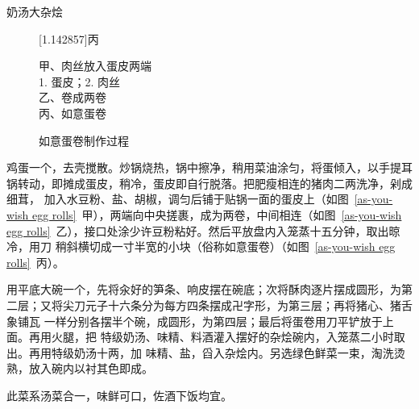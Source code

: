 \begin{recipe}{奶汤大杂烩}
\begin{figure}[h]
\begin{minipage}{11em}
	\baselineskip%
	\hbox{\fsfamily\scalebox{1}[1.142857]{丙}}%
	\vspace{1.5\baselineskip}%
	\caption{如意蛋卷制作过程}
	\label{as-you-wish egg rolls}
	\vspace{1\baselineskip}%
	\begingroup%
	\small%
	\noindent%
	\null\hspace{1.5em}甲、肉丝放入蛋皮两端\\
	\null\hspace{3.5em}1. 蛋皮；\hspace{0.5em}2. 肉丝\\
	\null\hspace{1.5em}乙、卷成两卷\\
	\null\hspace{1.5em}丙、如意蛋卷
	\endgroup
\end{minipage}
\vspace{-.25\baselineskip}%
\end{figure}%

\step 鸡蛋一个，去壳搅散。炒锅烧热，锅中擦净，稍用菜油涂匀，将蛋倾入，以手提耳
锅转动，即摊成蛋皮，稍冷，蛋皮即自行脱落。把肥瘦相连的猪肉二两洗净，剁成细茸，
加入水豆粉、盐、胡椒，调匀后铺于贴锅一面的蛋皮上（如图~\ref{as-you-wish egg
rolls}~甲），两端向中央搓裹，成为两卷，中间相连（如图~\ref{as-you-wish egg
rolls}~乙），接口处涂少许豆粉粘好。然后平放盘内入笼蒸十五分钟，取出晾冷，用刀
稍斜横切成一寸半宽的小块（俗称如意蛋卷）（如图~\ref{as-you-wish egg
rolls}~丙）。

\step 用平底大碗一个，先将汆好的笋条、响皮摆在碗底；次将酥肉逐片摆成圆形，为第
二层；又将尖刀元子十六条分为每方四条摆成卍字形，为第三层；再将猪心、猪舌象铺瓦
一样分别各摆半个碗，成圆形，为第四层；最后将蛋卷用刀平铲放于上面。再用火腿，把
特级奶汤、味精、料酒灌入摆好的杂烩碗内，入笼蒸二小时取出。再用特级奶汤十两，加
味精、盐，舀入杂烩内。另选绿色鲜菜一束，淘洗烫熟，放入碗内以衬其色即成。

\features

此菜系汤菜合一，味鲜可口，佐酒下饭均宜。

\end{recipe}

